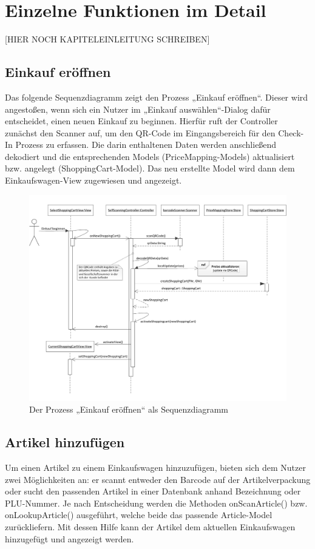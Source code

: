 \section{Einzelne Funktionen im Detail}
[HIER NOCH KAPITELEINLEITUNG SCHREIBEN]

\subsection{Einkauf eröffnen}
Das folgende Sequenzdiagramm zeigt den Prozess „Einkauf eröffnen“. Dieser wird angestoßen, wenn sich ein Nutzer im „Einkauf auswählen“-Dialog dafür entscheidet, einen neuen Einkauf zu beginnen. Hierfür ruft der Controller zunächst den Scanner auf, um den QR-Code im Eingangsbereich für den Check-In Prozess zu erfassen. Die darin enthaltenen Daten werden anschließend dekodiert und die entsprechenden Models (PriceMapping-Models) aktualisiert bzw. angelegt (ShoppingCart-Model). Das neu erstellte Model wird dann dem Einkaufswagen-View zugewiesen und angezeigt.

\begin{figure}[H]
\includegraphics[width=\linewidth]{res/seq_einkauf-eroeffnen.pdf}
\caption{Der Prozess „Einkauf eröffnen“ als Sequenzdiagramm}
\end{figure}

\subsection{Artikel hinzufügen}
Um einen Artikel zu einem Einkaufswagen hinzuzufügen, bieten sich dem Nutzer zwei Möglichkeiten an: er scannt entweder den Barcode auf der Artikelverpackung oder sucht den passenden Artikel in einer Datenbank anhand Bezeichnung oder PLU-Nummer. Je nach Entscheidung werden die Methoden onScanArticle() bzw. onLookupArticle() ausgeführt, welche beide das passende Article-Model zurückliefern. Mit dessen Hilfe kann der Artikel dem aktuellen Einkaufswagen hinzugefügt und angezeigt werden.

